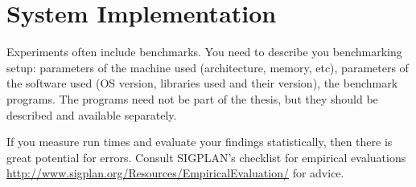 \chapter{System Implementation}\label{chap:implementation}

Experiments often include benchmarks.
You need to describe you benchmarking setup: parameters of the machine used (architecture, memory, etc), parameters of the software used (OS version, libraries used and their version), the benchmark programs.
The programs need not be part of the thesis, but they should be described and available separately.

If you measure run times and evaluate your findings statistically, then there is great potential for errors.
Consult SIGPLAN's checklist for empirical evaluations \url{http://www.sigplan.org/Resources/EmpiricalEvaluation/} for advice. 


